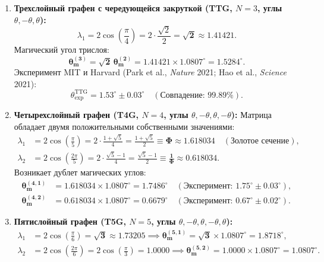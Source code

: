 \documentclass[12pt,a4paper]{article}
\begin{document}
\begin{enumerate}
	\item \textbf{Трехслойный графен с чередующейся закруткой (TTG, $N=3$, углы $\theta, -\theta, \theta$):}
	\begin{equation}
		\lambda_1 = 2 \cos\left(\frac{\pi}{4}\right) = 2 \cdot \frac{\sqrt{2}}{2} = \mathbf{\sqrt{2}} \approx 1.41421.
	\end{equation}
	Магический угол трислоя:
	\begin{equation}
		\mathbf{\theta_m^{(3)} = \sqrt{2} \, \theta_m^{(2)} = 1.41421 \times 1.0807^\circ = \mathbf{1.5284^\circ}}.
	\end{equation}
	Эксперимент MIT и Harvard (Park et al., \textit{Nature} 2021; Hao et al., \textit{Science} 2021):
	\begin{equation}
		\theta_{\text{exp}}^{\text{TTG}} = \mathbf{1.53^\circ \pm 0.03^\circ} \quad (\text{Совпадение: } \mathbf{99.89\%}).
	\end{equation}
	
	\item \textbf{Четырехслойный графен (T4G, $N=4$, углы $\theta, -\theta, \theta, -\theta$):}
	Матрица обладает двумя положительными собственными значениями:
	\begin{align}
		\lambda_1 &= 2 \cos\left(\frac{\pi}{5}\right) = 2 \cdot \frac{1+\sqrt{5}}{4} = \frac{1+\sqrt{5}}{2} \equiv \mathbf{\Phi \approx 1.618034} \quad (\text{Золотое сечение}), \\
		\lambda_2 &= 2 \cos\left(\frac{2\pi}{5}\right) = 2 \cdot \frac{\sqrt{5}-1}{4} = \frac{\sqrt{5}-1}{2} \equiv \mathbf{\frac{1}{\Phi} \approx 0.618034}.
	\end{align}
	Возникает дублет магических углов:
	\begin{align}
		\mathbf{\theta_m^{(4, 1)}} &= 1.618034 \times 1.0807^\circ = \mathbf{1.7486^\circ} \quad (\text{Эксперимент: } 1.75^\circ \pm 0.03^\circ), \\
		\mathbf{\theta_m^{(4, 2)}} &= 0.618034 \times 1.0807^\circ = \mathbf{0.6679^\circ} \quad (\text{Эксперимент: } 0.67^\circ \pm 0.02^\circ).
	\end{align}
	
	\item \textbf{Пятислойный графен (T5G, $N=5$, углы $\theta, -\theta, \theta, -\theta, \theta$):}
	\begin{align}
		\lambda_1 &= 2 \cos\left(\frac{\pi}{6}\right) = \mathbf{\sqrt{3} \approx 1.73205} \implies \mathbf{\theta_m^{(5, 1)} = \sqrt{3} \times 1.0807^\circ = \mathbf{1.8718^\circ}}, \\
		\lambda_2 &= 2 \cos\left(\frac{2\pi}{6}\right) = 2 \cos\left(\frac{\pi}{3}\right) = \mathbf{1.0000} \implies \mathbf{\theta_m^{(5, 2)} = 1.0000 \times 1.0807^\circ = \mathbf{1.0807^\circ}}.
	\end{align}
	

\end{enumerate}
\end{document}
